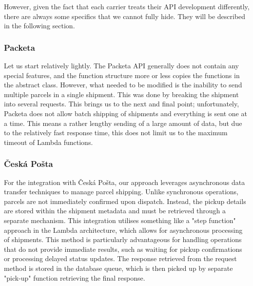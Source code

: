 However, given the fact that each carrier treats their API development differently, there are always some specifics that we cannot fully hide. 
They will be described in the following section.

\subsubsection{Packeta}
Let us start relatively lightly. 
The Packeta API generally does not contain any special features, and the function structure more or less copies the functions in the abstract class.
However, what needed to be modified is the inability to send multiple parcels in a single shipment.
This was done by breaking the shipment into several requests.
This brings us to the next and final point; unfortunately, Packeta does not allow batch shipping of shipments and everything is sent one at a time.
This means a rather lengthy sending of a large amount of data, but due to the relatively fast response time, this does not limit us to the maximum timeout of Lambda functions.

\subsubsection{Česká Pošta}
For the integration with Česká Pošta, our approach leverages asynchronous data transfer techniques to manage parcel shipping. 
Unlike synchronous operations, parcels are not immediately confirmed upon dispatch. Instead, the pickup details are stored within the shipment metadata and must be retrieved through a separate mechanism.
This integration utilises something like a "step function" approach in the Lambda architecture, which allows for asynchronous processing of shipments. This method is particularly advantageous for handling operations that do not provide immediate results, such as waiting for pickup confirmations or processing delayed status updates.
The response retrieved from the request method is stored in the database queue, which is then picked up by separate "pick-up" function retrieving the final response.

